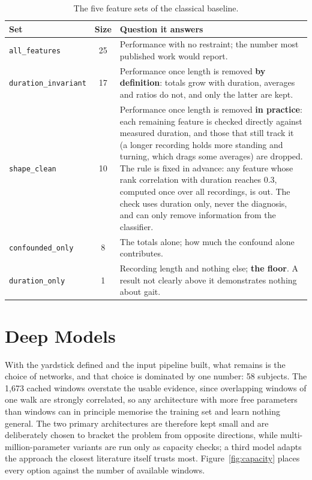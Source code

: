\begin{table}[H]
  \centering
  \caption[The five feature sets of the classical baseline]{The five feature sets of the classical baseline.}
  \label{tab:featuresets}
  \small
  \begin{tabular}{@{}lcp{8.2cm}@{}}
    \toprule
    Set & Size & Question it answers \\
    \midrule
    \texttt{all\_features} & 25 &
      Performance with no restraint; the number most published work would
      report. \\
    \texttt{duration\_invariant} & 17 &
      Performance once length is removed \textbf{by definition}: totals grow
      with duration, averages and ratios do not, and only the latter are
      kept. \\
    \texttt{shape\_clean} & 10 &
      Performance once length is removed \textbf{in practice}: each remaining
      feature is checked directly against measured duration, and those that
      still track it (a longer recording holds more standing and turning,
      which drags some averages) are dropped. The rule is fixed in advance:
      any feature whose rank correlation with duration reaches 0.3, computed
      once over all recordings, is out. The check uses duration only, never
      the diagnosis, and can only remove information from the classifier. \\
    \texttt{confounded\_only} & 8 &
      The totals alone; how much the confound alone contributes. \\
    \texttt{duration\_only} & 1 &
      Recording length and nothing else; \textbf{the floor}. A result not
      clearly above it demonstrates nothing about gait. \\
    \bottomrule
  \end{tabular}
\end{table}

\section{Deep Models}
\label{sec:deep}

With the yardstick defined and the input pipeline built, what remains is the
choice of networks, and that choice is dominated by one number: 58 subjects.
The 1{,}673 cached windows overstate the usable evidence, since overlapping
windows of one walk are strongly correlated, so any architecture with more
free parameters than windows can in principle memorise the training set and
learn nothing general. The two primary architectures are therefore kept
small and are deliberately chosen to bracket the problem from opposite
directions, while multi-million-parameter variants are run only as capacity
checks; a third model adapts the approach the closest literature itself
trusts most. Figure~\ref{fig:capacity} places every option against the number
of available windows.

